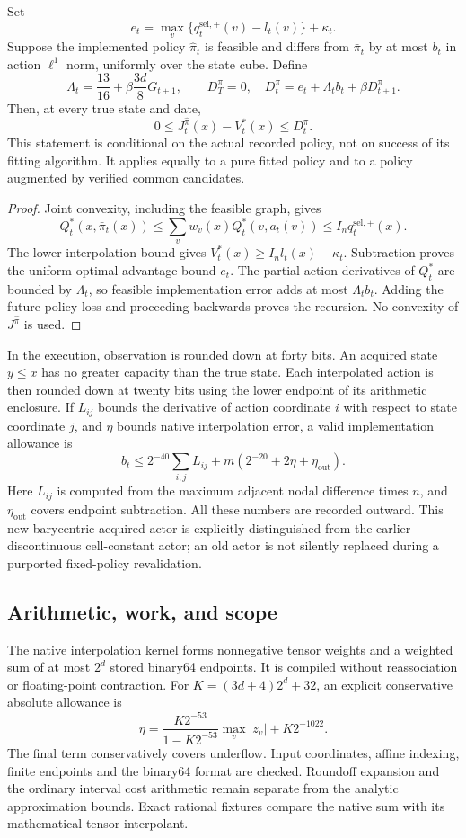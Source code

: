 \begin{theorem}\label{thm:policy62}
Set
\[
 e_t=\max_v\{q_t^{\mathrm{sel},+}(v)-l_t(v)\}+\kappa_t.
\]
Suppose the implemented policy $\widehat\pi_t$ is feasible and differs from $\bar\pi_t$ by at most $b_t$ in action $\ell^1$ norm, uniformly over the state cube. Define
\[
 \Lambda_t=\frac{13}{16}+\beta\frac{3d}{8}G_{t+1},\qquad
 D_T^\pi=0,\quad D_t^\pi=e_t+\Lambda_tb_t+\beta D_{t+1}^\pi.
\]
Then, at every true state and date,
\[
 0\le J_t^{\widehat\pi}(x)-V_t^*(x)\le D_t^\pi.
\]
This statement is conditional on the actual recorded policy, not on success of its fitting algorithm. It applies equally to a pure fitted policy and to a policy augmented by verified common candidates.
\end{theorem}

\begin{proof}
Joint convexity, including the feasible graph, gives
\[
 Q_t^*(x,\bar\pi_t(x))\le\sum_vw_v(x)Q_t^*(v,a_t(v))
       \le I_nq_t^{\mathrm{sel},+}(x).
\]
The lower interpolation bound gives $V_t^*(x)\ge I_nl_t(x)-\kappa_t$. Subtraction proves the uniform optimal-advantage bound $e_t$. The partial action derivatives of $Q_t^*$ are bounded by $\Lambda_t$, so feasible implementation error adds at most $\Lambda_tb_t$. Adding the future policy loss and proceeding backwards proves the recursion. No convexity of $J^{\widehat\pi}$ is used.
\end{proof}

In the execution, observation is rounded down at forty bits. An acquired state $y\le x$ has no greater capacity than the true state. Each interpolated action is then rounded down at twenty bits using the lower endpoint of its arithmetic enclosure. If $L_{ij}$ bounds the derivative of action coordinate $i$ with respect to state coordinate $j$, and $\eta$ bounds native interpolation error, a valid implementation allowance is
\[
 b_t\le 2^{-40}\sum_{i,j}L_{ij}
           +m(2^{-20}+2\eta+\eta_{\mathrm{out}}).
\]
Here $L_{ij}$ is computed from the maximum adjacent nodal difference times $n$, and $\eta_{\mathrm{out}}$ covers endpoint subtraction. All these numbers are recorded outward. This new barycentric acquired actor is explicitly distinguished from the earlier discontinuous cell-constant actor; an old actor is not silently replaced during a purported fixed-policy revalidation.

\subsection{Arithmetic, work, and scope}
The native interpolation kernel forms nonnegative tensor weights and a weighted sum of at most $2^d$ stored binary64 endpoints. It is compiled without reassociation or floating-point contraction. For $K=(3d+4)2^d+32$, an explicit conservative absolute allowance is
\[
 \eta=\frac{K2^{-53}}{1-K2^{-53}}\max_v|z_v|+K2^{-1022}.
\]
The final term conservatively covers underflow. Input coordinates, affine indexing, finite endpoints and the binary64 format are checked. Roundoff expansion and the ordinary interval cost arithmetic remain separate from the analytic approximation bounds. Exact rational fixtures compare the native sum with its mathematical tensor interpolant.

